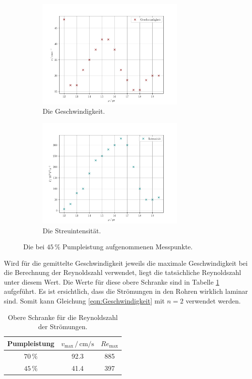 \begin{figure}
    \centering
    \begin{subfigure}{0.48\textwidth}
        \centering
        \includegraphics[height=5.5cm]{plots/45velocity.pdf}
        \caption{Die Geschwindigkeit.}
        \label{fig:45velo}
    \end{subfigure}
    \begin{subfigure}{0.48\textwidth}
        \centering
        \includegraphics[height=5.5cm]{plots/45intensity.pdf}
        \caption{Die Streuintensität.}
        \label{fig:45inten}
    \end{subfigure}
    \caption{Die bei $45\,\%$ Pumpleistung aufgenommenen Messpunkte.}
    \label{fig:45vi}
\end{figure}

Wird für die gemittelte Geschwindigkeit jeweils die maximale Geschwindigkeit bei die Berechnung der Reynoldszahl verwendet, 
liegt die tatsächliche Reynoldszahl unter diesem Wert. 
Die Werte für diese obere Schranke sind in Tabelle \ref{tab:Reynoldszahl} aufgeführt. 
Es ist ersichtlich, dass die Strömungen in den Rohren wirklich laminar sind. 
Somit kann Gleichung \eqref{eqn:Geschwindigkeit} mit $n=2$ verwendet werden. 
\begin{table}
    \centering
    \caption{Obere Schranke für die Reynoldszahl der Strömungen.}
    \label{tab:Reynoldszahl}
    \begin{tabular}{c c c}
        \toprule
        Pumpleistung & $v_\text{max}\,/\,\si{\centi\meter\per\second}$ & $Re_\text{max}$ \\
        \midrule
        $70\,\%$ & 92.3 & 885 \\
        $45\,\%$ & 41.4 & 397 \\        
        \bottomrule
    \end{tabular}
\end{table}

